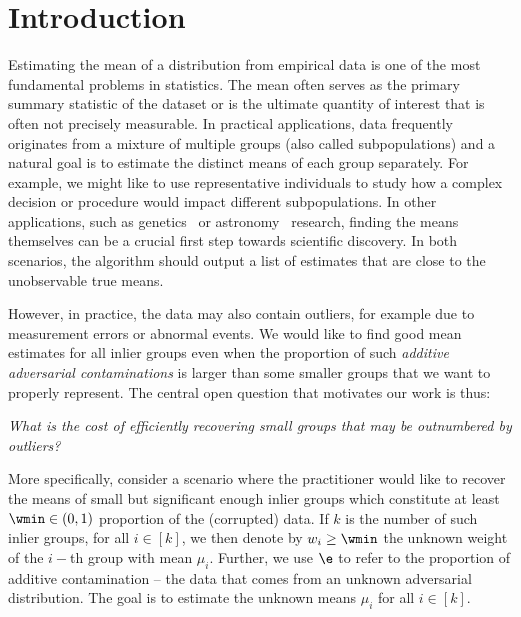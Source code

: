 \section{Introduction}
Estimating the mean of a distribution from empirical data is one of the most fundamental problems in statistics.
The mean often serves as the primary summary statistic of the dataset or is the ultimate %
quantity of interest that is often not precisely measurable.
In practical applications, data frequently originates from a mixture of multiple groups (also called subpopulations) and a natural goal is to estimate the distinct means of each group separately. 
For example, we might like to use representative individuals to study how a complex decision or procedure would impact different subpopulations.
In other applications, such as genetics~\cite{bickel2003robust} or astronomy~\cite{feigelson2012statistical} research, finding the means themselves
can be a crucial first step towards scientific discovery.
In both scenarios, the algorithm should output a list of estimates that are close to the unobservable true means. 


However, in practice,
the data may also contain outliers, for example due to measurement errors or abnormal events. 
We would like to find good mean estimates for all inlier groups even 
when the proportion  of such  \emph{additive adversarial contaminations} is larger than some smaller groups that we want to properly represent. %
The central open question that motivates our work is thus:
\begin{center}
\textit{What is the cost of efficiently recovering small groups that may be outnumbered by outliers?}
\end{center}

More specifically, consider a scenario where the practitioner would like to recover the means of small but significant enough inlier groups which constitute at least $\wmin \in (0,1)$ proportion of the (corrupted) data.
If $k$ is 
the number of such inlier groups, for all $i\in [k]$, we then denote by $w_i\geq \wmin$ the unknown weight of the $i-$th group with mean $\mu_i$.
Further, we use \(\e\) to refer to the
proportion of additive contamination -- the data that comes from an unknown adversarial distribution. The goal is to estimate the unknown means $\mu_i$ for all $i \in [k]$.

